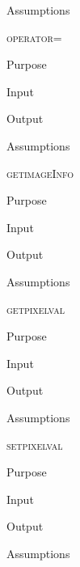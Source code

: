 \documentclass[pdftex, 11pt]{article}
\begin{document}
\begin{description}
\begin{description}
			\item{Assumptions}


		\end{description}


	\item{\textsc{operator=}}
		\begin{description}
			\item{Purpose}


			\item{Input}


			\item{Output}


			\item{Assumptions}


		\end{description}


	\item{\textsc{getimageInfo}}
		\begin{description}
			\item{Purpose}


			\item{Input}


			\item{Output}


			\item{Assumptions}


		\end{description}


	\item{\textsc{getpixelval}}
		\begin{description}
			\item{Purpose}


			\item{Input}


			\item{Output}


			\item{Assumptions}


		\end{description}


	\item{\textsc{setpixelval}}
		\begin{description}
			\item{Purpose}


			\item{Input}


			\item{Output}


			\item{Assumptions}



\end{description}
\end{description}
\end{document}
